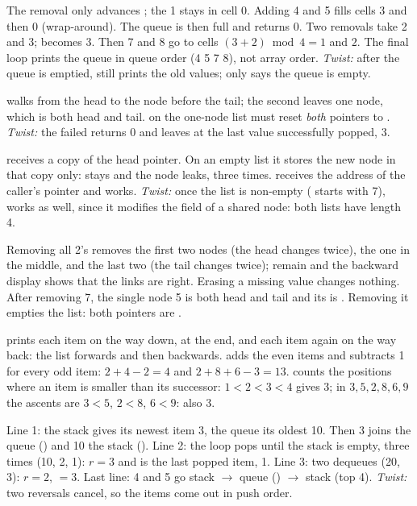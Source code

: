 The removal only advances ; the 1 stays in cell 0. Adding 4 and 5 fills cells 3
and then 0 (wrap-around). The queue is then full and  returns 0. Two
removals take 2 and 3;  becomes 3. Then 7 and 8 go to cells $(3+2)\bmod4=1$ and
$2$. The final loop prints the queue in queue order (4 5 7 8), not array order.
\emph{Twist:} after the queue is emptied,  still prints the old values; only
 says the queue is empty.

 walks from the head to the node before the tail; the second 
leaves one node, which is both head and tail.  on the one-node list must
reset \emph{both} pointers to . \emph{Twist:} the failed  returns 0
and leaves  at the last value successfully popped, 3.

 receives a copy of the head pointer. On an empty list it stores the new node
in that copy only:  stays  and the node leaks, three times. 
receives the address of the caller's pointer and works. \emph{Twist:} once the list is
non-empty ( starts with 7),  works as well, since it modifies the
 field of a shared node: both lists have length 4.

Removing all 2's removes the first two nodes (the head changes twice), the one in the
middle, and the last two (the tail changes twice);  remain and the backward
display shows that the  links are right. Erasing a missing value changes nothing.
After removing 7, the single node 5 is both head and tail and its  is
. Removing it empties the list: both pointers are .

 prints each item on the way down, \cc{\#} at the end, and each item again
on the way back: the list forwards and then backwards.  adds the even items and
subtracts 1 for every odd item: $2+4-2=4$ and $2+8+6-3=13$.  counts the positions
where an item is smaller than its successor: $1<2<3<4$ gives 3; in
$3,5,2,8,6,9$ the ascents are $3<5$, $2<8$, $6<9$: also 3.

Line 1: the stack gives its newest item 3, the queue its oldest 10. Then 3 joins the
queue (\cc{[20 3]}) and 10 the stack (\cc{[1 2 10]}). Line 2: the loop pops until the stack is
empty, three times (10, 2, 1): $r=3$ and  is the last popped item, 1. Line 3: two
dequeues (20, 3): $r=2$, $=3$. Last line: 4 and 5 go stack $\to$ queue () $\to$ stack
(top 4). \emph{Twist:} two reversals cancel, so the items come out in push order.

